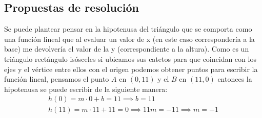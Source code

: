 \documentclass[a4paper]{article}
\begin{document}
\subsection{Propuestas de resolución}
Se puede plantear pensar en la hipotenusa del triángulo que se comporta como una función lineal que al evaluar un valor de x (en este caso correspondería a la base) me devolvería el valor de la y (correspondiente a la altura). Como es un triángulo rectángulo isósceles si ubicamos sus catetos para que coincidan con los ejes y el vértice entre ellos con el origen podemos obtener puntos para escribir la función lineal, pensamos el punto $A$ en $(0,11)$ y el $B$ en $(11,0)$ entonces la hipotenusa se puede escribir de la siguiente manera:
\begin{gather*}
    h(0)=m \cdot 0 +b=11 \implies b=11\\
    h(11)= m \cdot 11 +11=0 \implies 11m=-11 \implies m=-1
\end{gather*}
\end{document}
